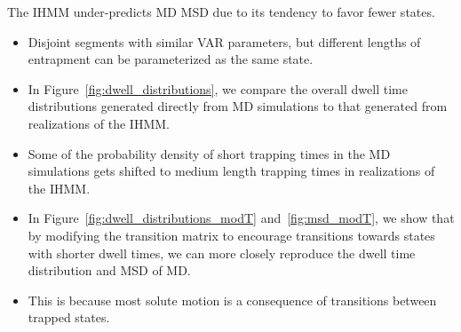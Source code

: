 \documentclass[journal=jpcbfk,manuscript=article]{achemso}
\begin{document}
  \noindent The IHMM under-predicts MD MSD due to its tendency to favor fewer states.\cite{}
  \begin{itemize}
    \item Disjoint segments with similar VAR parameters, but different lengths of 
    entrapment can be parameterized as the same state.
    \item In Figure~\ref{fig:dwell_distributions}, we compare the overall dwell 
    time distributions generated directly from MD simulations to that generated from 
    realizations of the IHMM. 
    \item Some of the probability density of short trapping times in the MD simulations
    gets shifted to medium length trapping times in realizations of the IHMM.
    \item In Figure~\ref{fig:dwell_distributions_modT} and~\ref{fig:msd_modT}, we show 
    that by modifying the transition matrix to encourage transitions towards states with
    shorter dwell times, we can more closely reproduce the dwell time distribution and 
    MSD of MD.
    \item This is because most solute motion is a consequence of transitions between 
    trapped states.
  \end{itemize}
  
\end{document}
